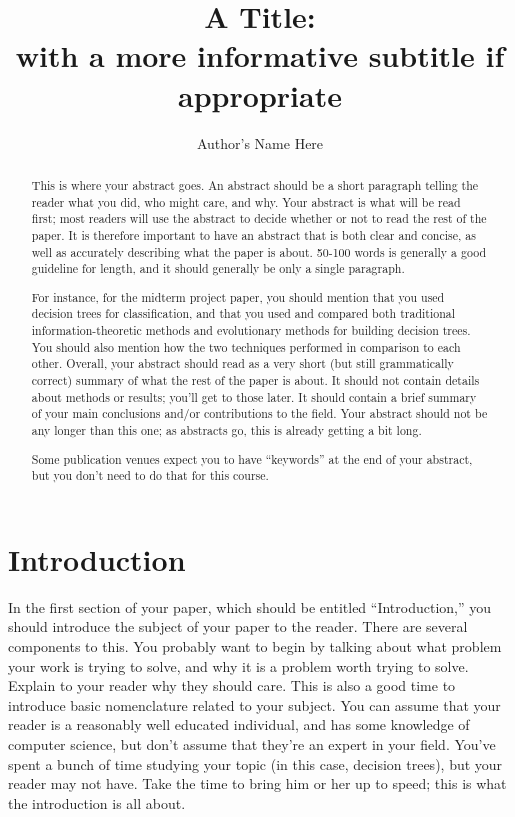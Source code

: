 \documentclass[12pt, letterpaper]{article}
\title{A Title: \\ with a more informative subtitle if appropriate}
\author{Author's Name Here}
\begin{document}
\maketitle

\begin{abstract}
This is where your abstract goes.  An abstract should be a short paragraph
telling the reader what you did, who might care, and why.  Your abstract is what
will be read first; most readers will use the abstract to decide whether or not
to read the rest of the paper.  It is therefore important to have an abstract
that is both clear and concise, as well as accurately describing what the paper
is about.  50-100 words is generally a good guideline for length, and it should
generally be only a single paragraph.

For instance, for the midterm project paper, you should mention that you used
decision trees for classification, and that you used and compared both
traditional information-theoretic methods and evolutionary methods for building
decision trees.  You should also mention how the two techniques performed in
comparison to each other.  Overall, your abstract should read as a very short
(but still grammatically correct) summary of what the rest of the paper is
about.  It should not contain details about methods or results; you'll get to
those later.  It should contain a brief summary of your main conclusions and/or
contributions to the field. Your abstract should not be any longer than this
one; as abstracts go, this is already getting a bit long.

Some publication venues expect you to have ``keywords'' at the end of your
abstract, but you don't need to do that for this course.
\end{abstract}

\section{Introduction}
In the first section of your paper, which should be entitled ``Introduction,''
you should introduce the subject of your paper to the reader.  There are several
components to this.  You probably want to begin by talking about what problem
your work is trying to solve, and why it is a problem worth trying to solve.
Explain to your reader why they should care.  This is also a good time to
introduce basic nomenclature related to your subject.  You can assume that your
reader is a reasonably well educated individual, and has some knowledge of
computer science, but don't assume that they're an expert in your field.  You've
spent a bunch of time studying your topic (in this case, decision trees), but
your reader may not have.  Take the time to bring him or her up to speed; this
is what the introduction is all about.
\end{document}
